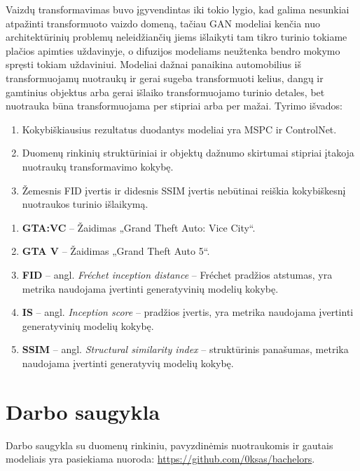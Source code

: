 \documentclass{VUMIFPSbakalaurinis}
\begin{document}
Vaizdų transformavimas buvo įgyvendintas iki tokio lygio, kad galima nesunkiai atpažinti transformuoto vaizdo domeną, tačiau GAN modeliai kenčia nuo architektūrinių problemų neleidžiančių jiems išlaikyti tam tikro turinio tokiame plačios apimties uždavinyje, o difuzijos modeliams neužtenka bendro mokymo spręsti tokiam uždaviniui. Modeliai dažnai panaikina automobilius iš transformuojamų nuotraukų ir gerai sugeba transformuoti kelius, dangų ir gamtinius objektus arba gerai išlaiko transformuojamo turinio detales, bet nuotrauka būna transformuojama per stipriai arba per mažai.
Tyrimo išvados:
\begin{enumerate}
    \item Kokybiškiausius rezultatus duodantys modeliai yra MSPC ir ControlNet.
    \item Duomenų rinkinių struktūriniai ir objektų dažnumo skirtumai stipriai įtakoja nuotraukų transformavimo kokybę.
    \item Žemesnis FID įvertis ir didesnis SSIM įvertis nebūtinai reiškia kokybiškesnį nuotraukos turinio išlaikymą.
\end{enumerate}

\begin{enumerate}
    \item \textbf{GTA:VC} – Žaidimas „Grand Theft Auto: Vice City“.
    \item \textbf{GTA V} – Žaidimas „Grand Theft Auto 5“.
    \item \textbf{FID} – angl. \emph{Fréchet inception distance} – Fréchet pradžios atstumas, yra metrika naudojama įvertinti generatyvinių modelių kokybę.
    \item \textbf{IS} – angl. \emph{Inception score} – pradžios įvertis, yra metrika naudojama įvertinti generatyvinių modelių kokybę.
    \item \textbf{SSIM} – angl. \emph{Structural similarity index} – struktūrinis panašumas, metrika naudojama įvertinti generatyvių modelių kokybę.
\end{enumerate}

\printbibliography[heading=bibintoc]

\appendix

\section{Darbo saugykla}
    Darbo saugykla su duomenų rinkiniu, pavyzdinėmis nuotraukomis ir gautais modeliais yra pasiekiama nuoroda: \href{https://github.com/0ksas/bachelors}{https://github.com/0ksas/bachelors}.
\end{document}
